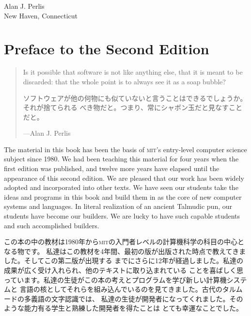 \documentclass[oneside]{book}
\newcommand{\acronym}[1]{\textsc{\MakeLowercase{#1}}}
\begin{document}
\vspace{0.5em}
\noindent
Alan J. Perlis\\
New Haven, Connecticut


\label{Preface}
\chapter*{Preface to the Second Edition}

\begin{quote}
Is it possible that software is not like anything else, that it is meant to be
discarded: that the whole point is to always see it as a soap bubble?

ソフトウェアが他の何物にも似ていないと言うことはできるでしょうか。それが捨てられる
べき物だと。つまり、常にシャボン玉だと見なすことだと。

---Alan J. Perlis
\end{quote}

\vspace{0.7em}

\noindent
The material in this book has been the basis of \acronym{MIT}'s entry-level
computer science subject since 1980.  We had been teaching this material for
four years when the first edition was published, and twelve more years have
elapsed until the appearance of this second edition.  We are pleased that our
work has been widely adopted and incorporated into other texts.  We have seen
our students take the ideas and programs in this book and build them in as the
core of new computer systems and languages.  In literal realization of an
ancient Talmudic pun, our students have become our builders.  We are lucky to
have such capable students and such accomplished builders.

この本の中の教材は1980年から\acronym{MIT}の入門者レベルの計算機科学の科目の中心となる物です。
私達はこの教材を4年間、最初の版が出版された時点で教えてきました。そしてこの第二版が出現する
までにさらに12年が経過しました。私達の成果が広く受け入れられ、他のテキストに取り込まれている
ことを喜ばしく思っています。私達の生徒がこの本の考えとプログラムを学び新しい計算機システムと
言語の核としてそれらを組み込んでいるのを見てきました。古代のタルムードの多義語の文字認識では、
私達の生徒が開発者になってくれました。そのような能力有る学生と熟練した開発者を得たことは
とても幸運なことでした。
\end{document}
